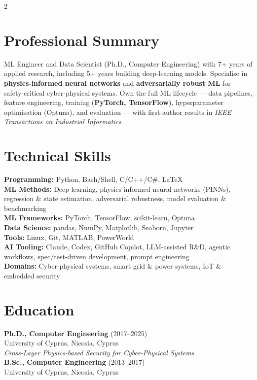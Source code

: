 \documentclass[10pt,a4paper]{article}
\begin{document}
\begin{multicols}{2}

\section*{Professional Summary}
ML Engineer and Data Scientist (Ph.D., Computer Engineering) with 7+ years of applied research, including 5+ years building deep-learning models. Specialise in \textbf{physics-informed neural networks} and \textbf{adversarially robust ML} for safety-critical cyber-physical systems. Own the full ML lifecycle --- data pipelines, feature engineering, training (\textbf{PyTorch, TensorFlow}), hyperparameter optimisation (Optuna), and evaluation --- with first-author results in \textit{IEEE Transactions on Industrial Informatics}.

\section*{Technical Skills}
\textbf{Programming:} Python, Bash/Shell, C/C++/C\#, LaTeX\\[4pt]
\textbf{ML Methods:} Deep learning, physics-informed neural networks (PINNs), regression \& state estimation, adversarial robustness, model evaluation \& benchmarking\\[4pt]
\textbf{ML Frameworks:} PyTorch, TensorFlow, scikit-learn, Optuna\\[4pt]
\textbf{Data Science:} pandas, NumPy, Matplotlib, Seaborn, Jupyter\\[4pt]
\textbf{Tools:} Linux, Git, MATLAB, PowerWorld\\[4pt]
\textbf{AI Tooling:} Claude, Codex, GitHub Copilot, LLM-assisted R\&D, agentic workflows, spec/test-driven development, prompt engineering\\[4pt]
\textbf{Domains:} Cyber-physical systems, smart grid \& power systems, IoT \& embedded security

\section*{Education}
\textbf{Ph.D., Computer Engineering} (2017--2025)\\
University of Cyprus, Nicosia, Cyprus\\
\textit{Cross-Layer Physics-based Security for Cyber-Physical Systems}\\[5pt]
\textbf{B.Sc., Computer Engineering} (2013--2017)\\
University of Cyprus, Nicosia, Cyprus


\end{multicols}
\end{document}
